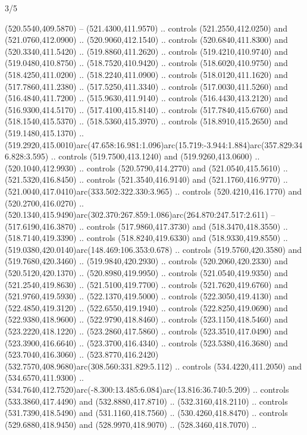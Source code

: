 \begin{flagdescription}{3/5}
\begin{scope}[shift={(0.5\flaglength,0.5\flagwidth)},scale=\flagwidth/510]
\begin{scope}[y=0.80pt, x=0.80pt, yscale=-1.06, xscale=1.06,yshift=-240pt,xshift=-400pt]
\begin{scope}[cm={{0.83333,0.0,0.0,0.83333,(154.64672,48.64761)}}]
\begin{scope}[cm={{0.93334,0.0,0.0,0.93334,(-4.86471,22.64035)}}]
\begin{scope}[draw=black]
  (520.5540,409.5870) -- (521.4300,411.9570) .. controls (521.2550,412.0250) and
  (521.0760,412.0900) .. (520.9060,412.1540) .. controls (520.6840,411.8300) and
  (520.3340,411.5420) .. (519.8860,411.2620) .. controls (519.4210,410.9740) and
  (519.0480,410.8750) .. (518.7520,410.9420) .. controls (518.6020,410.9750) and
  (518.4250,411.0200) .. (518.2240,411.0900) .. controls (518.0120,411.1620) and
  (517.7860,411.2380) .. (517.5250,411.3340) .. controls (517.0030,411.5260) and
  (516.4840,411.7200) .. (515.9630,411.9140) .. controls (516.4430,413.2120) and
  (516.9300,414.5170) .. (517.4100,415.8140) .. controls (517.7840,415.6760) and
  (518.1540,415.5370) .. (518.5360,415.3970) .. controls (518.8910,415.2650) and
  (519.1480,415.1370) ..
  (519.2920,415.0010)arc(47.658:16.981:1.096)arc(15.719:-3.944:1.884)arc(357.829:346.828:3.595)
  .. controls (519.7500,413.1240) and (519.9260,413.0600) .. (520.1040,412.9930)
  .. controls (520.5790,414.2770) and (521.0540,415.5610) .. (521.5320,416.8450)
  .. controls (521.3540,416.9140) and (521.1760,416.9770) ..
  (521.0040,417.0410)arc(333.502:322.330:3.965) .. controls (520.4210,416.1770)
  and (520.2700,416.0270) ..
  (520.1340,415.9490)arc(302.370:267.859:1.086)arc(264.870:247.517:2.611) --
  (517.6190,416.3870) .. controls (517.9860,417.3730) and (518.3470,418.3550) ..
  (518.7140,419.3390) .. controls (518.8240,419.6330) and (518.9330,419.8550) ..
  (519.0380,420.0140)arc(148.469:106.353:0.678) .. controls (519.5760,420.3580)
  and (519.7680,420.3460) .. (519.9840,420.2930) .. controls (520.2060,420.2330)
  and (520.5120,420.1370) .. (520.8980,419.9950) .. controls (521.0540,419.9350)
  and (521.2540,419.8630) .. (521.5100,419.7700) .. controls (521.7620,419.6760)
  and (521.9760,419.5930) .. (522.1370,419.5000) .. controls (522.3050,419.4130)
  and (522.4850,419.3120) .. (522.6550,419.1940) .. controls (522.8250,419.0690)
  and (522.9380,418.9600) .. (522.9790,418.8460) .. controls (523.1150,418.5460)
  and (523.2220,418.1220) .. (523.2860,417.5860) .. controls (523.3510,417.0490)
  and (523.3900,416.6640) .. (523.3700,416.4340) .. controls (523.5380,416.3680)
  and (523.7040,416.3060) ..
  (523.8770,416.2420)(532.7570,408.9680)arc(308.560:331.829:5.112) .. controls
  (534.4220,411.2050) and (534.6570,411.9300) ..
  (534.7640,412.7520)arc(-8.300:13.485:6.084)arc(13.816:36.740:5.209) ..
  controls (533.3860,417.4490) and (532.8880,417.8710) .. (532.3160,418.2110) ..
  controls (531.7390,418.5490) and (531.1160,418.7560) .. (530.4260,418.8470) ..
  controls (529.6880,418.9450) and (528.9970,418.9070) .. (528.3460,418.7070) ..

\end{scope}
\end{scope}
\end{scope}
\end{scope}
\end{scope}
\end{flagdescription}
